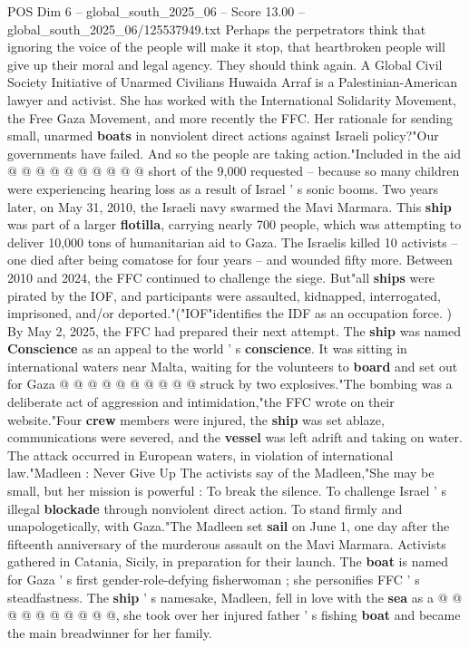 \begin{textsample}{POS Dim 6 – global\_south\_2025\_06 – Score 13.00 – global\_south\_2025\_06/125537949.txt}
Perhaps the perpetrators think that ignoring the voice of the people will make it stop, that heartbroken people will give up their moral and legal agency.
They should think again.
A Global Civil Society Initiative of Unarmed Civilians Huwaida Arraf is a Palestinian-American lawyer and activist.
She has worked with the International Solidarity Movement, the Free Gaza Movement, and more recently the FFC.
Her rationale for sending small, unarmed \textbf{boats} in nonviolent direct actions against Israeli policy?"Our governments have failed.
And so the people are taking action."Included in the aid @ @ @ @ @ @ @ @ @ @ short of the 9,000 requested -- because so many children were experiencing hearing loss as a result of Israel ' s sonic booms.
Two years later, on May 31, 2010, the Israeli navy swarmed the Mavi Marmara.
This \textbf{ship} was part of a larger \textbf{flotilla}, carrying nearly 700 people, which was attempting to deliver 10,000 tons of humanitarian aid to Gaza.
The Israelis killed 10 activists -- one died after being comatose for four years -- and wounded fifty more.
Between 2010 and 2024, the FFC continued to challenge the siege.
But"all \textbf{ships} were pirated by the IOF, and participants were assaulted, kidnapped, interrogated, imprisoned, and/or deported."("IOF"identifies the IDF as an occupation force. ) By May 2, 2025, the FFC had prepared their next attempt.
The \textbf{ship} was named \textbf{Conscience} as an appeal to the world ' s \textbf{conscience}.
It was sitting in international waters near Malta, waiting for the volunteers to \textbf{board} and set out for Gaza @ @ @ @ @ @ @ @ @ @ struck by two explosives."The bombing was a deliberate act of aggression and intimidation,"the FFC wrote on their website."Four \textbf{crew} members were injured, the \textbf{ship} was set ablaze, communications were severed, and the \textbf{vessel} was left adrift and taking on water.
The attack occurred in European waters, in violation of international law."Madleen : Never Give Up The activists say of the Madleen,"She may be small, but her mission is powerful : To break the silence.
To challenge Israel ' s illegal \textbf{blockade} through nonviolent direct action.
To stand firmly and unapologetically, with Gaza."The Madleen set \textbf{sail} on June 1, one day after the fifteenth anniversary of the murderous assault on the Mavi Marmara.
Activists gathered in Catania, Sicily, in preparation for their launch.
The \textbf{boat} is named for Gaza ' s first gender-role-defying fisherwoman ; she personifies FFC ' s steadfastness.
The \textbf{ship} ' s namesake, Madleen, fell in love with the \textbf{sea} as a @ @ @ @ @ @ @ @ @ @, she took over her injured father ' s fishing \textbf{boat} and became the main breadwinner for her family.

\end{textsample}
